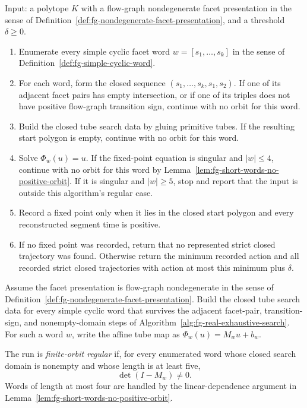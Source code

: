 \begin{unverified}
\begin{algorithm}%
\label{alg:fg-real-exhaustive-search}
Input: a polytope \(K\) with a flow-graph nondegenerate facet presentation in
the sense of Definition~\ref{def:fg-nondegenerate-facet-presentation}, and a
threshold \(\delta\ge0\).

\begin{enumerate}
\item Enumerate every simple cyclic facet word \(w=[s_1,\ldots,s_k]\) in the
  sense of Definition~\ref{def:fg-simple-cyclic-word}.
\item For each word, form the closed sequence
  \((s_1,\ldots,s_k,s_1,s_2)\).  If one of its adjacent facet pairs has empty
  intersection, or if one of its triples does not have positive flow-graph
  transition sign, continue with no orbit for this word.
\item Build the closed tube search data by gluing primitive tubes.  If the
  resulting start polygon is empty, continue with no orbit for this word.
\item Solve \(\Phi_w(u)=u\).  If the fixed-point equation is singular and
  \(|w|\le4\), continue with no orbit for this word by
  Lemma~\ref{lem:fg-short-words-no-positive-orbit}.  If it is singular and
  \(|w|\ge5\), stop and report that the input is outside this algorithm's
  regular case.
\item Record a fixed point only when it lies in the closed start polygon and
  every reconstructed segment time is positive.
\item If no fixed point was recorded, return that no represented strict closed
  trajectory was found.  Otherwise return the minimum recorded action and all
  recorded strict closed trajectories with action at most this minimum plus
  \(\delta\).
\end{enumerate}
\end{algorithm}
\end{unverified}

\begin{unverified}
\begin{definition}\label{def:fg-finite-orbit-regularity}
Assume the facet presentation is flow-graph nondegenerate in the sense of
Definition~\ref{def:fg-nondegenerate-facet-presentation}.  Build the closed
tube search data for every simple cyclic word that survives the adjacent
facet-pair, transition-sign, and nonempty-domain steps of
Algorithm~\ref{alg:fg-real-exhaustive-search}.
For such a word \(w\), write the affine tube map as \(\Phi_w(u)=M_wu+b_w\).

The run is \emph{finite-orbit regular} if, for every enumerated word whose
closed search domain is nonempty and whose length is at least five,
\[
  \det(I-M_w)\ne0.
\]
Words of length at most four are handled by the linear-dependence argument in
Lemma~\ref{lem:fg-short-words-no-positive-orbit}.
\end{definition}
\end{unverified}


